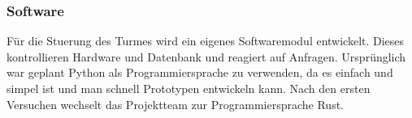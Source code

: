 \subsubsection{Software}

Für die Stuerung des Turmes wird ein eigenes Softwaremodul entwickelt. Dieses kontrollieren Hardware und Datenbank und reagiert auf Anfragen. Ursprünglich war geplant Python als Programmiersprache zu verwenden, da es einfach und simpel ist und man schnell Prototypen entwickeln kann. Nach den ersten Versuchen wechselt das Projektteam zur Programmiersprache Rust.

\clearpage




\clearpage


\clearpage

